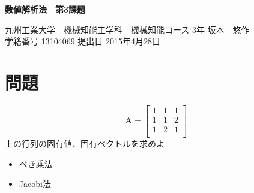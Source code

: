 \documentclass[a4j,twoside,openright,11pt]{jsarticle}
\begin{document}
\begin{screen}
\huge
\begin{center}
{\bf 数値解析法　第3課題}\\
\end{center}

\normalsize
\begin{flushright}
九州工業大学　機械知能工学科　機械知能コース 3年 坂本　悠作\\学籍番号 13104069 \hspace{0.2in}提出日 2015年4月28日
\end{flushright}
\end{screen}

\section*{問題}
\[
\bm{A}=
  \left[
    \begin{array}{rrr}
      1 & 1 & 1 \\
      1 & 1 & 2 \\
      1 & 2 & 1 \\
    \end{array}
  \right]
\]
上の行列の固有値、固有ベクトルを求めよ\\

\begin{itemize}
\item べき乘法
\item Jacobi法
\end{itemize}
\end{document}
